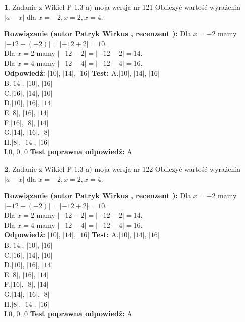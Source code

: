 \documentclass[12pt, a4paper]{article}
\theoremstyle{definition} %
\newtheorem{zad}{}
\newcommand{\zadStart}[1]{\begin{zad}#1\newline}
\newcommand{\zadStop}{\end{zad}}
\newcommand{\rozwStart}[2]{\noindent \textbf{Rozwiązanie (autor #1 , recenzent #2): }\newline}
\newcommand{\rozwStop}{\newline}
\newcommand{\odpStart}{\noindent \textbf{Odpowiedź:}\newline}
\newcommand{\odpStop}{\newline}
\newcommand{\testStart}{\noindent \textbf{Test:}\newline}
\newcommand{\testStop}{\newline}
\newcommand{\kluczStart}{\noindent \textbf{Test poprawna odpowiedź:}\newline}
\newcommand{\kluczStop}{\newline}
\begin{document}
\zadStart{Zadanie z Wikieł P 1.3 a) moja wersja nr 121}
Obliczyć wartość wyrażenia $|a - x|$ dla $x=-2,x=2,x=4$.
\zadStop
\rozwStart{Patryk Wirkus}{}
Dla $x = -2$ mamy $|-12 - (-2)| = |-12 + 2| = 10$.\\
Dla $x = 2$ mamy $|-12 - 2| = |-12 - 2| = 14$.\\
Dla $x = 4$ mamy $|-12 - 4| = |-12 - 4| = 16$.\\
\rozwStop
\odpStart
$|10|$, $|14|$, $|16|$
\odpStop
\testStart
A.$|10|$, $|14|$, $|16|$\\
B.$|14|$, $|10|$, $|16|$\\
C.$|16|$, $|14|$, $|10|$\\
D.$|10|$, $|16|$, $|14|$\\
E.$|8|$, $|16|$, $|14|$\\
F.$|16|$, $|8|$, $|14|$\\
G.$|14|$, $|16|$, $|8|$\\
H.$|8|$, $|14|$, $|16|$\\
I.$0$, $0$, $0$
\testStop
\kluczStart
A
\kluczStop



\zadStart{Zadanie z Wikieł P 1.3 a) moja wersja nr 122}
Obliczyć wartość wyrażenia $|a - x|$ dla $x=-2,x=2,x=4$.
\zadStop
\rozwStart{Patryk Wirkus}{}
Dla $x = -2$ mamy $|-12 - (-2)| = |-12 + 2| = 10$.\\
Dla $x = 2$ mamy $|-12 - 2| = |-12 - 2| = 14$.\\
Dla $x = 4$ mamy $|-12 - 4| = |-12 - 4| = 16$.\\
\rozwStop
\odpStart
$|10|$, $|14|$, $|16|$
\odpStop
\testStart
A.$|10|$, $|14|$, $|16|$\\
B.$|14|$, $|10|$, $|16|$\\
C.$|16|$, $|14|$, $|10|$\\
D.$|10|$, $|16|$, $|14|$\\
E.$|8|$, $|16|$, $|14|$\\
F.$|16|$, $|8|$, $|14|$\\
G.$|14|$, $|16|$, $|8|$\\
H.$|8|$, $|14|$, $|16|$\\
I.$0$, $0$, $0$
\testStop
\kluczStart
A
\kluczStop
\end{document}

